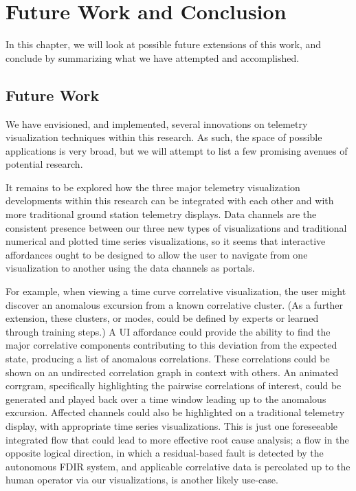 \chapter{Future Work and Conclusion}

In this chapter, we will look at possible future extensions of this work, and conclude by summarizing what we have attempted and accomplished.

\section{Future Work}

We have envisioned, and implemented, several innovations on telemetry visualization techniques within this research. As such, the space of possible applications is very broad, but we will attempt to list a few promising avenues of potential research.

It remains to be explored how the three major telemetry visualization developments within this research can be integrated with each other and with more traditional ground station telemetry displays. Data channels are the consistent presence between our three new types of visualizations and traditional numerical and plotted time series visualizations, so it seems that interactive affordances ought to be designed to allow the user to navigate from one visualization to another using the data channels as portals.

For example, when viewing a time curve correlative visualization, the user might discover an anomalous excursion from a known correlative cluster. (As a further extension, these clusters, or modes, could be defined by experts or learned through training steps.) A UI affordance could provide the ability to find the major correlative components contributing to this deviation from the expected state, producing a list of anomalous correlations. These correlations could be shown on an undirected correlation graph in context with others. An animated corrgram, specifically highlighting the pairwise correlations of interest, could be generated and played back over a time window leading up to the anomalous excursion. Affected channels could also be highlighted on a traditional telemetry display, with appropriate time series visualizations. This is just one foreseeable integrated flow that could lead to more effective root cause analysis; a flow in the opposite logical direction, in which a residual-based fault is detected by the autonomous FDIR system, and applicable correlative data is percolated up to the human operator via our visualizations, is another likely use-case.

